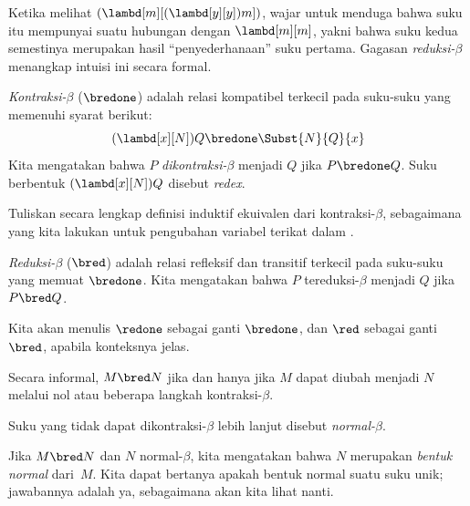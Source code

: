\documentclass[../../../include/open-logic-section]{subfiles}
\begin{document}

Ketika melihat $(\lambd[m][(\lambd[y][y]) m])$, wajar untuk menduga bahwa
suku itu mempunyai suatu hubungan dengan $\lambd[m][m]$, yakni bahwa suku
kedua semestinya merupakan hasil ``penyederhanaan'' suku pertama. Gagasan
\emph{reduksi-$\beta$} menangkap intuisi ini secara formal.

\begin{defn} 
  \emph{Kontraksi-$\beta$} ($\bredone$) adalah relasi kompatibel terkecil pada
  suku-suku yang memenuhi syarat berikut:
  \[
    (\lambd[x][N])Q \bredone \Subst{N}{Q}{x}
  \]
  Kita mengatakan bahwa $P$ \emph{dikontraksi-$\beta$} menjadi $Q$ jika
  $P \bredone Q$. Suku berbentuk $(\lambd[x][N])Q$ disebut \emph{redex}.
\end{defn}

\begin{prob} 
  Tuliskan secara lengkap definisi induktif ekuivalen dari kontraksi-$\beta$,
  sebagaimana yang kita lakukan untuk pengubahan variabel terikat dalam
  .
\end{prob}

\begin{defn} 
  \emph{Reduksi-$\beta$} ($\bred$) adalah relasi refleksif dan transitif
  terkecil pada suku-suku yang memuat $\bredone$. Kita mengatakan bahwa $P$
  tereduksi-$\beta$ menjadi $Q$ jika $P \bred Q$.
\end{defn}

Kita akan menulis $\redone$ sebagai ganti $\bredone$, dan $\red$ sebagai ganti
$\bred$, apabila konteksnya jelas.

Secara informal, $M \bred N$ jika dan hanya jika $M$ dapat diubah menjadi $N$
melalui nol atau beberapa langkah kontraksi-$\beta$.

\begin{defn}
Suku yang tidak dapat dikontraksi-$\beta$ lebih lanjut disebut
\emph{normal-$\beta$}.
\end{defn}

Jika $M \bred N$ dan $N$ normal-$\beta$, kita mengatakan bahwa $N$ merupakan
\emph{bentuk normal} dari~$M$. Kita dapat bertanya apakah bentuk normal suatu
suku unik; jawabannya adalah ya, sebagaimana akan kita lihat nanti.
\end{document}
